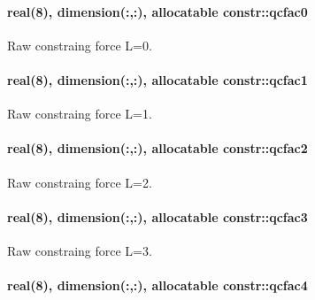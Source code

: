 \paragraph[{\texorpdfstring{qcfac0}{qcfac0}}]{\setlength{\rightskip}{0pt plus 5cm}real(8), dimension(\+:,\+:), allocatable constr\+::qcfac0}\hypertarget{namespaceconstr_a6b2a3c58bac912d4a73157efe7676b4c}{}\label{namespaceconstr_a6b2a3c58bac912d4a73157efe7676b4c}


Raw constraing force L=0. 

\paragraph[{\texorpdfstring{qcfac1}{qcfac1}}]{\setlength{\rightskip}{0pt plus 5cm}real(8), dimension(\+:,\+:), allocatable constr\+::qcfac1}\hypertarget{namespaceconstr_a7e953ba3a87c37edea28ada189132d1b}{}\label{namespaceconstr_a7e953ba3a87c37edea28ada189132d1b}


Raw constraing force L=1. 

\paragraph[{\texorpdfstring{qcfac2}{qcfac2}}]{\setlength{\rightskip}{0pt plus 5cm}real(8), dimension(\+:,\+:), allocatable constr\+::qcfac2}\hypertarget{namespaceconstr_a782673708e19234113cb3f084461832b}{}\label{namespaceconstr_a782673708e19234113cb3f084461832b}


Raw constraing force L=2. 

\paragraph[{\texorpdfstring{qcfac3}{qcfac3}}]{\setlength{\rightskip}{0pt plus 5cm}real(8), dimension(\+:,\+:), allocatable constr\+::qcfac3}\hypertarget{namespaceconstr_a7b3aac306329483616d504a65054b8fb}{}\label{namespaceconstr_a7b3aac306329483616d504a65054b8fb}


Raw constraing force L=3. 

\paragraph[{\texorpdfstring{qcfac4}{qcfac4}}]{\setlength{\rightskip}{0pt plus 5cm}real(8), dimension(\+:,\+:), allocatable constr\+::qcfac4}\hypertarget{namespaceconstr_af93a2b72075cfd5f649183e392e4f496}{}\label{namespaceconstr_af93a2b72075cfd5f649183e392e4f496}


